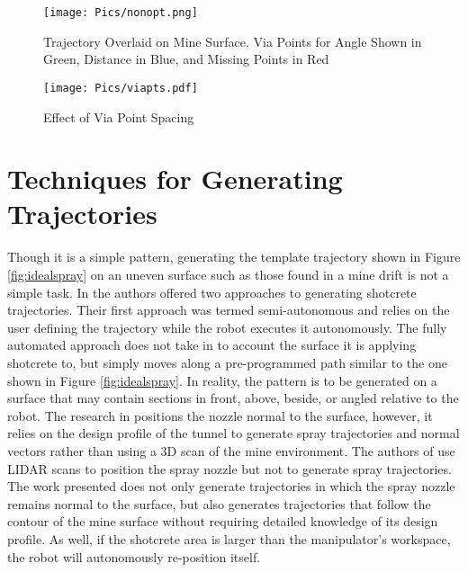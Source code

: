\begin{figure}[h]
    \centering
    \texttt{[image: Pics/nonopt.png]}
    \caption{Trajectory Overlaid on Mine Surface. Via Points for Angle Shown in Green, Distance in Blue, and Missing Points in Red}
    \label{fig:unidealspray}
\end{figure}

\begin{figure}[h]
    \centering
    \texttt{[image: Pics/viapts.pdf]}
    \caption{Effect of Via Point Spacing}
    \label{fig:viapts}
\end{figure}

\section{Techniques for Generating Trajectories}
Though it is a simple pattern, generating the template trajectory shown in Figure \ref{fig:idealspray} on an uneven surface such as those found in a mine drift is not a simple task. In \cite{fully} the authors offered two approaches to generating shotcrete trajectories. Their first approach was termed semi-autonomous and relies on the user defining the trajectory while the robot executes it autonomously. The fully automated approach does not take in to account the surface it is applying shotcrete to, but simply moves along a pre-programmed path similar to the one shown in Figure \ref{fig:idealspray}. In reality, the pattern is to be generated on a surface that may contain sections in front, above, beside, or angled relative to the robot. The research in \cite{steal} positions the nozzle normal to the surface, however, it relies on the design profile of the tunnel to generate spray trajectories and normal vectors rather than using a 3D scan of the mine environment. The authors of \cite{artd} use LIDAR scans to position the spray nozzle but not to generate spray trajectories. The work presented does not only generate trajectories in which the spray nozzle remains normal to the surface, but also generates trajectories that follow the contour of the mine surface without requiring detailed knowledge of its design profile. As well, if the shotcrete area is larger than the manipulator's workspace, the robot will autonomously re-position itself.\\

